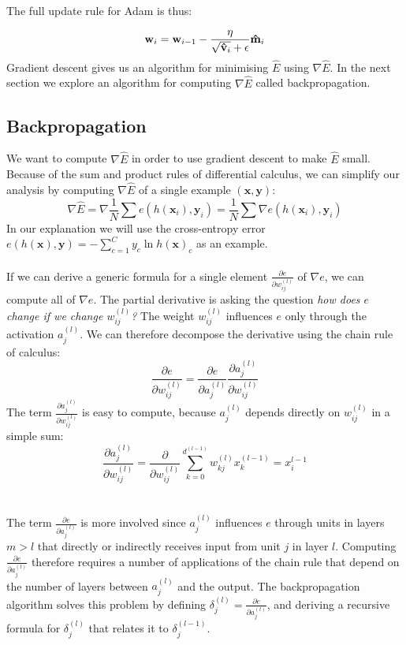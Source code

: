 The full update rule for Adam is thus:

$$
\mathbf{w}_i = \mathbf{w}_{i - 1} - \frac{\eta}{\sqrt{\mathbf{\hat{v}}_i} + \epsilon} \mathbf{\hat{m}}_i
$$
Gradient descent gives us an algorithm for minimising $\hat{E}$ using $\nabla\hat{E}$. In the next section we explore an algorithm for computing $\nabla\hat{E}$ called backpropagation.

\subsection{Backpropagation}
We want to compute $\nabla\hat{E}$ in order to use gradient descent to make $\hat{E}$ small. Because of the sum and product rules of differential calculus, we can simplify our analysis by computing $\nabla\hat{E}$ of a single example $(\mathbf{x}, \mathbf{y})$:
$$
\nabla \hat{E} = \nabla \frac{1}{N}\sum e(h(\mathbf{x}_i), \mathbf{y}_i) = \frac{1}{N}\sum \nabla e(h(\mathbf{x}_i), \mathbf{y}_i)
$$
In our explanation we will use the cross-entropy error $e(h(\mathbf{x}), \mathbf{y}) = -\sum_{c=1}^Cy_c \ln h(\mathbf{x})_c$ as an example. 
\\\\
If we can derive a generic formula for a single element $\frac{\partial e}{\partial w^{(l)}_{ij}}$ of $\nabla e$, we can compute all of $\nabla e$. The partial derivative is asking the question \textit{how does $e$ change if we change $w^{(l)}_{ij}$?} The weight $w^{(l)}_{ij}$ influences $e$ only through the activation $a^{(l)}_{j}$. We can therefore decompose the derivative using the chain rule of calculus:
$$
\frac{\partial e}{\partial w^{(l)}_{ij}} = \frac{\partial e}{\partial a^{(l)}_j} \frac{\partial a^{(l)}_j}{\partial w^{(l)}_{ij}}
$$
The term $\frac{\partial a^{(l)}_j}{\partial w^{(l)}_{ij}}$ is easy to compute, because $a^{(l)}_{j}$ depends directly on $w^{(l)}_{ij}$ in a simple sum:
$$
\frac{\partial a^{(l)}_j}{\partial w^{(l)}_{ij}} = \frac{\partial}{\partial w^{(l)}_{ij}} \sum\limits_{k=0}^{d^{(l-1)}} w^{(l)}_{kj} x^{(l-1)}_{k} = x^{l-1}_{i}
$$
\\\\
The term $\frac{\partial e}{\partial a^{(l)}_j}$ is more involved since $a^{(l)}_j$ influences $e$ through units in layers $m > l$ that directly or indirectly receives input from unit $j$ in layer $l$. Computing $\frac{\partial e}{\partial a^{(l)}_j}$ therefore requires a number of applications of the chain rule that depend on the number of layers between $a^{(l)}_j$ and the output. The backpropagation algorithm solves this problem by defining $\delta^{(l)}_j = \frac{\partial e}{\partial a^{(l)}_j}$, and deriving a recursive formula for $\delta^{(l)}_{j}$ that relates it to $\delta^{(l-1)}_j$.

